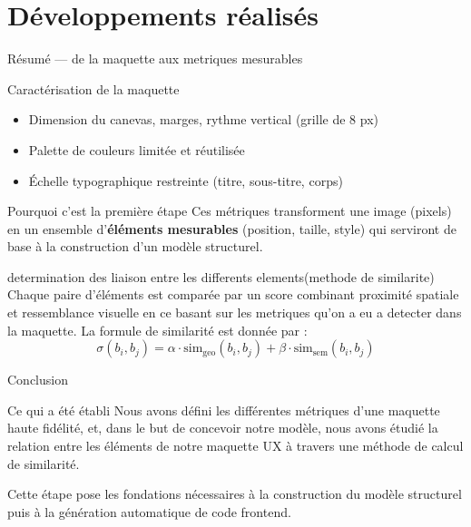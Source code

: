 \documentclass[11pt]{beamer}
\begin{document}
\section{Développements réalisés}
\begin{frame}{Résumé — de la maquette aux metriques mesurables}
  \small
  \begin{block}{Caractérisation de la maquette}
    \begin{itemize}
      \item Dimension du canevas, marges, rythme vertical (grille de 8 px)
      \item Palette de couleurs limitée et réutilisée
      \item Échelle typographique restreinte (titre, sous-titre, corps)
     
    \end{itemize}
  \end{block}
  \begin{infobox}{Pourquoi c'est la première étape}
    Ces métriques transforment une image (pixels) en un ensemble d'\textbf{éléments
    mesurables} (position, taille, style) qui serviront de base à la construction d'un modèle structurel.
  \end{infobox}
\end{frame}

\begin{frame}{determination des liaison entre les differents elements(methode de similarite)}
  \small
  Chaque paire d'éléments est comparée par un score combinant proximité spatiale et
  ressemblance visuelle en ce basant sur les metriques qu'on a eu a detecter dans la maquette. La formule de similarité est donnée par :
  \[
    \sigma(b_i,b_j) = \alpha \cdot \text{sim}_{\text{geo}}(b_i,b_j) + \beta \cdot \text{sim}_{\text{sem}}(b_i,b_j)
  \]
 
\end{frame}

\begin{frame}{Conclusion}
  \begin{infobox}{Ce qui a été établi}
    Nous avons défini les différentes métriques d'une maquette
    haute fidélité, et, dans le but de concevoir notre modèle, nous avons étudié la
    relation entre les éléments de notre maquette UX à travers une méthode de calcul
    de similarité.
  \end{infobox}
  \vspace{0.6em}
  Cette étape pose les fondations nécessaires à la construction du modèle structurel
  puis à la génération automatique de code frontend.
\end{frame}
\end{document}
